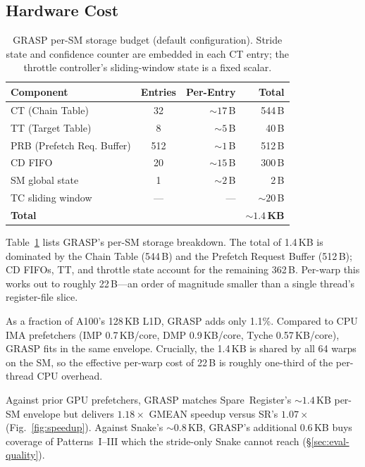 \documentclass[sigconf, screen, review]{acmart}
\begin{document}
\subsection{Hardware Cost}
\label{sec:eval-cost}

\begin{table}[!htbp]
  \caption{GRASP per-SM storage budget (default configuration).
    Stride state and confidence counter are embedded in each CT
    entry; the throttle controller's sliding-window state is a
    fixed scalar.}
  \label{tab:grasp-budget}
  \centering
  \small
  \begin{tabular}{@{}lcrr@{}}
    \toprule
    \textbf{Component} & \textbf{Entries} & \textbf{Per-Entry} & \textbf{Total} \\
    \midrule
    CT (Chain Table)          & 32  & ${\sim}17$\,B & 544\,B \\
    TT (Target Table)         & 8   & ${\sim}5$\,B  & 40\,B  \\
    PRB (Prefetch Req. Buffer)& 512 & ${\sim}1$\,B  & 512\,B \\
    CD FIFO                   & 20  & ${\sim}15$\,B & 300\,B \\
    SM global state           & 1   & ${\sim}2$\,B  & 2\,B   \\
    TC sliding window         & ---           & ---  & ${\sim}20$\,B  \\
    \midrule
    \textbf{Total}            &     &               & \textbf{${\sim}1.4$\,KB} \\
    \bottomrule
  \end{tabular}
\end{table}

Table~\ref{tab:grasp-budget} lists GRASP's per-SM storage
breakdown. The total of 1.4\,KB is dominated by the Chain Table
(544\,B) and the Prefetch Request Buffer (512\,B); CD FIFOs, TT,
and throttle state account for the remaining 362\,B. Per-warp
this works out to roughly 22\,B---an order of magnitude smaller
than a single thread's register-file slice.

As a fraction of A100's 128\,KB L1D, GRASP adds only 1.1\%.
Compared to CPU IMA prefetchers (IMP 0.7\,KB/core,
DMP 0.9\,KB/core, Tyche 0.57\,KB/core), GRASP fits in the same
envelope. Crucially, the 1.4\,KB is shared by all 64 warps on
the SM, so the effective per-warp cost of 22\,B is roughly
one-third of the per-thread CPU overhead.

Against prior GPU prefetchers, GRASP matches Spare~Register's
${\sim}1.4$\,KB per-SM envelope but delivers $1.18\times$
GMEAN speedup versus SR's $1.07\times$ (Fig.~\ref{fig:speedup}).
Against Snake's ${\sim}0.8$\,KB, GRASP's additional 0.6\,KB
buys coverage of Patterns~I--III which the stride-only Snake
cannot reach (\S\ref{sec:eval-quality}).
\end{document}
